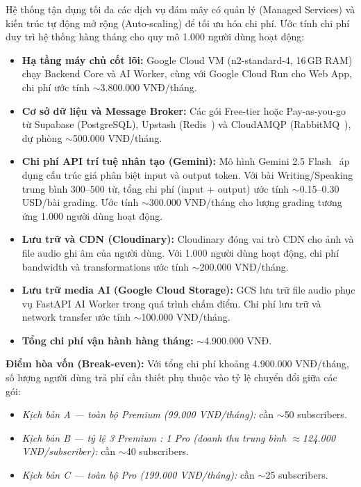 Hệ thống tận dụng tối đa các dịch vụ đám mây có quản lý (Managed Services) và kiến trúc tự động mở rộng (Auto-scaling) để tối ưu hóa chi phí. Ước tính chi phí duy trì hệ thống hàng tháng cho quy mô 1.000 người dùng hoạt động:

\begin{itemize}
    \item \textbf{Hạ tầng máy chủ cốt lõi:} Google Cloud VM (n2-standard-4, 16\,GB RAM) chạy Backend Core và AI Worker, cùng với Google Cloud Run cho Web App, chi phí ước tính $\sim$3.800.000 VNĐ/tháng.

    \item \textbf{Cơ sở dữ liệu và Message Broker:} Các gói Free-tier hoặc Pay-as-you-go từ Supabase (PostgreSQL), Upstash (Redis~\cite{redis-docs}) và CloudAMQP (RabbitMQ~\cite{rabbitmq-docs}), dự phòng $\sim$500.000 VNĐ/tháng.

    \item \textbf{Chi phí API trí tuệ nhân tạo (Gemini):} Mô hình Gemini 2.5 Flash~\cite{gemini-pricing} áp dụng cấu trúc giá phân biệt input và output token. Với bài Writing/Speaking trung bình 300--500 từ, tổng chi phí (input + output) ước tính $\sim$0.15--0.30\,USD/bài grading. Ước tính $\sim$300.000 VNĐ/tháng cho lượng grading tương ứng 1.000 người dùng hoạt động.

    \item \textbf{Lưu trữ và CDN (Cloudinary):} Cloudinary đóng vai trò CDN cho ảnh và file audio ghi âm của người dùng. Với 1.000 người dùng hoạt động, chi phí bandwidth và transformations ước tính $\sim$200.000 VNĐ/tháng.

    \item \textbf{Lưu trữ media AI (Google Cloud Storage):} GCS lưu trữ file audio phục vụ FastAPI AI Worker trong quá trình chấm điểm. Chi phí lưu trữ và network transfer ước tính $\sim$100.000 VNĐ/tháng.

    \item \textbf{Tổng chi phí vận hành hàng tháng:} $\sim$4.900.000 VNĐ.
\end{itemize}

\textbf{Điểm hòa vốn (Break-even):} Với tổng chi phí khoảng 4.900.000 VNĐ/tháng, số lượng người dùng trả phí cần thiết phụ thuộc vào tỷ lệ chuyển đổi giữa các gói:

\begin{itemize}
    \item \textit{Kịch bản A --- toàn bộ Premium (99.000 VNĐ/tháng):} cần $\sim$50 subscribers.
    \item \textit{Kịch bản B --- tỷ lệ 3 Premium : 1 Pro (doanh thu trung bình $\approx$124.000 VNĐ/subscriber):} cần $\sim$40 subscribers.
    \item \textit{Kịch bản C --- toàn bộ Pro (199.000 VNĐ/tháng):} cần $\sim$25 subscribers.
\end{itemize}

